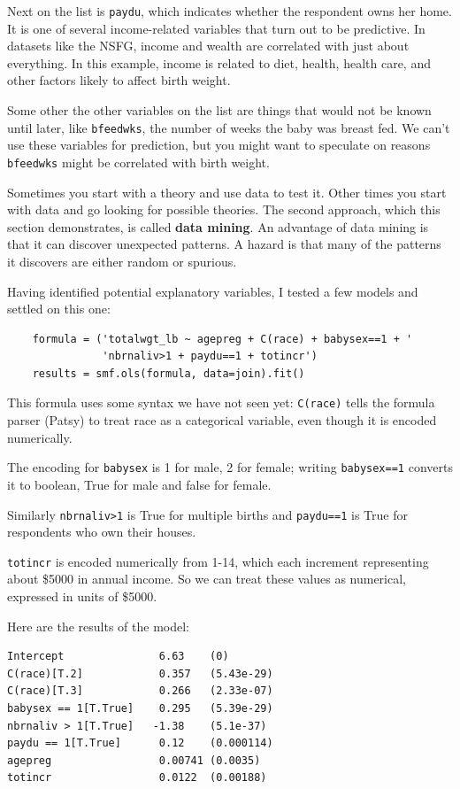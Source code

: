 \documentclass[12pt]{book}
\begin{document}
Next on the list is {\tt paydu}, which indicates whether the
respondent owns her home.  It is one of several income-related
variables that turn out to be predictive.  In datasets like the NSFG,
income and wealth are correlated with just about everything.  In this
example, income is related to diet, health, health care, and other
factors likely to affect birth weight.

Some other the other variables on the list are things that would not
be known until later, like {\tt bfeedwks}, the number of weeks
the baby was breast fed.  We can't use these variables for prediction,
but you might want to speculate on reasons
{\tt bfeedwks} might be correlated with birth weight.

Sometimes you start with a theory and use data to test it.  Other
times you start with data and go looking for possible theories.
The second approach, which this section demonstrates, is
called {\bf data mining}.  An advantage of data mining is that it
can discover unexpected patterns.  A hazard is that many of the
patterns it discovers are either random or spurious.

Having identified potential explanatory variables, I tested a few
models and settled on this one:

\begin{verbatim}
    formula = ('totalwgt_lb ~ agepreg + C(race) + babysex==1 + '
               'nbrnaliv>1 + paydu==1 + totincr')
    results = smf.ols(formula, data=join).fit()
\end{verbatim}

This formula uses some syntax we have not seen yet:
{\tt C(race)} tells the formula parser (Patsy) to treat race as a
categorical variable, even though it is encoded numerically.

The encoding for {\tt babysex} is 1 for male, 2 for female; writing
{\tt babysex==1} converts it to boolean, True for male and false for
female.

Similarly {\tt nbrnaliv>1} is True for multiple births and 
{\tt paydu==1} is True for respondents who own their houses.

{\tt totincr} is encoded numerically from 1-14, which each increment
representing about \$5000 in annual income.  So we can treat these
values as numerical, expressed in units of \$5000.

Here are the results of the model:

\begin{verbatim}
Intercept               6.63    (0)
C(race)[T.2]            0.357   (5.43e-29)
C(race)[T.3]            0.266   (2.33e-07)
babysex == 1[T.True]    0.295   (5.39e-29)
nbrnaliv > 1[T.True]   -1.38    (5.1e-37)
paydu == 1[T.True]      0.12    (0.000114)
agepreg                 0.00741 (0.0035)
totincr                 0.0122  (0.00188)
\end{verbatim}
\end{document}
